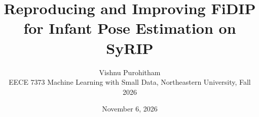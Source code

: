 \documentclass[11pt,letterpaper]{article}
\title{\vspace{-8mm}Reproducing and Improving FiDIP for Infant Pose Estimation on SyRIP}
\author{Vishnu Purohitham\\[2pt]
  {\small EECE 7373 Machine Learning with Small Data, Northeastern University, Fall 2026}}
\date{{\small November 6, 2026}}
\begin{document}
\maketitle
\vspace{-4mm}
\begin{abstract}

\end{abstract}











{\small\setlength{\bibsep}{2pt plus 1pt}

}

\clearpage
\appendix


\end{document}
